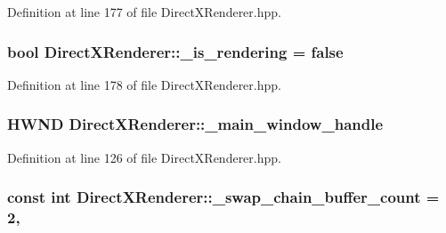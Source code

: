 Definition at line 177 of file Direct\+X\+Renderer.\+hpp.

\subsubsection[{\texorpdfstring{\+\_\+is\+\_\+rendering}{_is_rendering}}]{\setlength{\rightskip}{0pt plus 5cm}bool Direct\+X\+Renderer\+::\+\_\+is\+\_\+rendering = false\hspace{0.3cm}{\ttfamily [protected]}}\hypertarget{class_direct_x_renderer_aeb385222af964c11d944f758ae9fb4fc_aeb385222af964c11d944f758ae9fb4fc}{}\label{class_direct_x_renderer_aeb385222af964c11d944f758ae9fb4fc_aeb385222af964c11d944f758ae9fb4fc}


Definition at line 178 of file Direct\+X\+Renderer.\+hpp.

\subsubsection[{\texorpdfstring{\+\_\+main\+\_\+window\+\_\+handle}{_main_window_handle}}]{\setlength{\rightskip}{0pt plus 5cm}H\+W\+ND Direct\+X\+Renderer\+::\+\_\+main\+\_\+window\+\_\+handle\hspace{0.3cm}{\ttfamily [protected]}}\hypertarget{class_direct_x_renderer_a85dde4c45dcb539e89d83edec7382c56_a85dde4c45dcb539e89d83edec7382c56}{}\label{class_direct_x_renderer_a85dde4c45dcb539e89d83edec7382c56_a85dde4c45dcb539e89d83edec7382c56}


Definition at line 126 of file Direct\+X\+Renderer.\+hpp.

\subsubsection[{\texorpdfstring{\+\_\+swap\+\_\+chain\+\_\+buffer\+\_\+count}{_swap_chain_buffer_count}}]{\setlength{\rightskip}{0pt plus 5cm}const int Direct\+X\+Renderer\+::\+\_\+swap\+\_\+chain\+\_\+buffer\+\_\+count = 2\hspace{0.3cm}{\ttfamily [static]}, {\ttfamily [protected]}}\hypertarget{class_direct_x_renderer_aaf675ecf10cb34d5247f78920f8851da_aaf675ecf10cb34d5247f78920f8851da}{}\label{class_direct_x_renderer_aaf675ecf10cb34d5247f78920f8851da_aaf675ecf10cb34d5247f78920f8851da}


